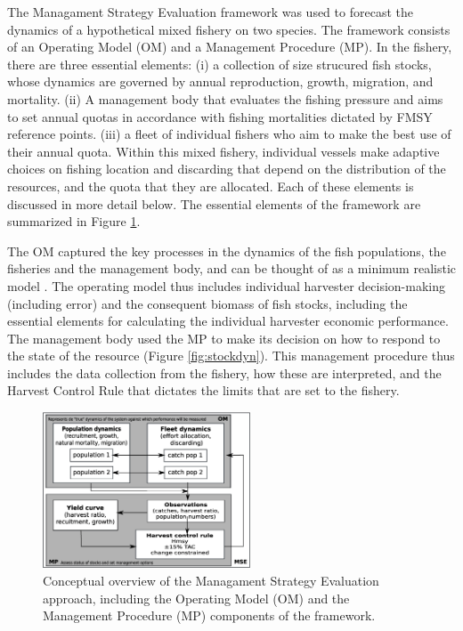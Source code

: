 \documentclass[12pt,oneline,a4paper,numbib]{ouparticle}
\numberwithin{equation}{subsection} %
\begin{document}
The Managament Strategy Evaluation framework was used to forecast the dynamics of a hypothetical mixed fishery on two species. The framework consists of an Operating Model (OM) and a Management Procedure (MP). In the fishery, there are three essential elements: (i) a collection of size strucured fish stocks, whose dynamics are governed by annual reproduction, growth, migration, and mortality. (ii) A management body that evaluates the fishing pressure and aims to set annual quotas in accordance with fishing mortalities dictated by FMSY reference points. (iii) a fleet of individual fishers who aim to make the best use of their annual quota. Within this mixed fishery, individual vessels make adaptive choices on fishing location and discarding that depend on the distribution of the resources, and the quota that they are allocated. Each of these elements is discussed in more detail below. The essential elements of the framework are summarized in Figure \ref{fig:MSE}.

The OM captured the key processes in the dynamics of the fish populations, the fisheries and the management body, and can be thought of as a minimum realistic model \cite{Punt1995}.  The operating model thus includes  individual harvester decision-making (including error) and the consequent biomass of fish stocks, including the essential elements for calculating the individual harvester economic performance. The  management body used the MP to make its decision on how to respond to the state of the resource (Figure \ref{fig:stockdyn}). This management procedure thus includes the data collection from the fishery, how these are interpreted, and the Harvest Control Rule that dictates the limits that are set to the fishery. 

 
\begin{figure}[!h]
\centering
\includegraphics[width=0.55\textwidth]{Figures/MSE.eps} 
\caption{Conceptual overview of the Managament Strategy Evaluation approach, including the Operating Model (OM) and the Management Procedure (MP) components of the framework.}
\label{fig:MSE}
\end{figure}
\end{document}
